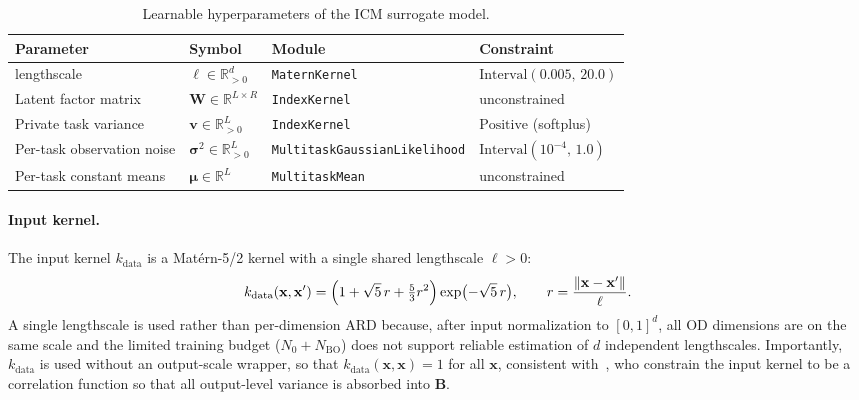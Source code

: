 \documentclass[11pt]{article}
\begin{document}
\begin{table}[h]
\centering
\caption{Learnable hyperparameters of the ICM surrogate model.}
\label{tab:icm_hyperparameters}
\begin{tabular}{llll}
\toprule
\textbf{Parameter} & \textbf{Symbol} & \textbf{Module} & \textbf{Constraint} \\
\midrule
lengthscale
& $\boldsymbol{\ell} \in \mathbb{R}^d_{>0}$
& \texttt{MaternKernel}
& $\text{Interval}(0.005,\, 20.0)$ \\

Latent factor matrix
& $\mathbf{W} \in \mathbb{R}^{L \times R}$
& \texttt{IndexKernel}
& unconstrained \\

Private task variance
& $\mathbf{v} \in \mathbb{R}^L_{>0}$
& \texttt{IndexKernel}
& $\text{Positive}$ (softplus) \\

Per-task observation noise
& $\boldsymbol{\sigma}^2 \in \mathbb{R}^L_{>0}$
& \texttt{MultitaskGaussianLikelihood}
& $\text{Interval}(10^{-4},\, 1.0)$ \\

Per-task constant means
& $\boldsymbol{\mu} \in \mathbb{R}^L$
& \texttt{MultitaskMean}
& unconstrained \\
\bottomrule
\end{tabular}
\end{table}

\paragraph{Input kernel.}
The input kernel $k_{\mathrm{data}}$ is a Mat\'{e}rn-5/2 kernel with a single
shared lengthscale $\ell > 0$:
%
\begin{equation}
    k_{\mathrm{data}}(\mathbf{x}, \mathbf{x}')
    = \Bigl(1 + \sqrt{5}\,r + \tfrac{5}{3}r^2\Bigr)\exp\bigl(-\sqrt{5}\,r\bigr),
    \qquad
    r = \frac{\|\mathbf{x} - \mathbf{x}'\|}{\ell}.
\end{equation}
%
A single lengthscale is used rather than per-dimension ARD because, after input
normalization to $[0,1]^d$, all OD dimensions are on the same scale and the
limited training budget ($N_0 + N_{\mathrm{BO}}$) does not support reliable
estimation of $d$ independent lengthscales. Importantly, $k_{\mathrm{data}}$ is
used without an output-scale wrapper, so that $k_{\mathrm{data}}(\mathbf{x},
\mathbf{x}) = 1$ for all $\mathbf{x}$, consistent
with~\parencite{bonilla2008multitask}, who constrain the input kernel to be a
correlation function so that all output-level variance is absorbed into $\mathbf{B}$.
\end{document}
